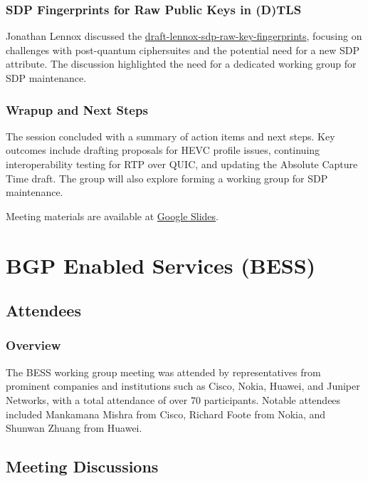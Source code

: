 \documentclass{article}
\begin{document}
\subsubsection{SDP Fingerprints for Raw Public Keys in (D)TLS}
Jonathan Lennox discussed the \href{https://datatracker.ietf.org/doc/html/draft-lennox-sdp-raw-key-fingerprints}{draft-lennox-sdp-raw-key-fingerprints}, focusing on challenges with post-quantum ciphersuites and the potential need for a new SDP attribute. The discussion highlighted the need for a dedicated working group for SDP maintenance.

\subsubsection{Wrapup and Next Steps}
The session concluded with a summary of action items and next steps. Key outcomes include drafting proposals for HEVC profile issues, continuing interoperability testing for RTP over QUIC, and updating the Absolute Capture Time draft. The group will also explore forming a working group for SDP maintenance.

Meeting materials are available at \href{https://docs.google.com/presentation/d/1bLGLkbxmi4w8Od5vUU-YTRREF8sEBJP0XBJOTdm4-T8/}{Google Slides}.




\newpage

\section{BGP Enabled Services (BESS) }

\subsection{Attendees}
\subsubsection{Overview}
The BESS working group meeting was attended by representatives from prominent companies and institutions such as Cisco, Nokia, Huawei, and Juniper Networks, with a total attendance of over 70 participants. Notable attendees included Mankamana Mishra from Cisco, Richard Foote from Nokia, and Shunwan Zhuang from Huawei.

\subsection{Meeting Discussions}
\end{document}
